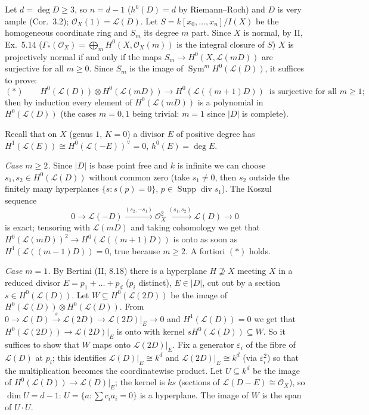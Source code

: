 \documentclass[11pt]{article}
\begin{document}
\pf
Let $d=\deg D\ge3$, so $n=d-1$ ($h^0(D)=d$ by Riemann--Roch) and $D$ is very ample (Cor.~3.2); $\mathcal O_X(1)=\mathcal L(D)$. Let $S=k[x_0,\dots,x_n]/I(X)$ be the homogeneous coordinate ring and $S_m$ its degree $m$ part. Since $X$ is normal, by II, Ex.~5.14 ($\Gamma_*(\mathcal O_X)=\bigoplus_m H^0(X,\mathcal O_X(m))$ is the integral closure of $S$) $X$ is projectively normal if and only if the maps $S_m\to H^0(X,\mathcal L(mD))$ are surjective for all $m\ge0$. Since $S_m$ is the image of $\operatorname{Sym}^mH^0(\mathcal L(D))$, it suffices to prove:
\[ (\ast)\qquad H^0(\mathcal L(D))\otimes H^0(\mathcal L(mD))\to H^0(\mathcal L((m+1)D))\ \text{ is surjective for all }m\ge1 ;\]
then by induction every element of $H^0(\mathcal L(mD))$ is a polynomial in $H^0(\mathcal L(D))$ (the cases $m=0,1$ being trivial: $m=1$ since $|D|$ is complete).

Recall that on $X$ (genus $1$, $K=0$) a divisor $E$ of positive degree has $H^1(\mathcal L(E))\cong H^0(\mathcal L(-E))^\vee=0$, $h^0(E)=\deg E$.

\emph{Case $m\ge2$.} Since $|D|$ is base point free and $k$ is infinite we can choose $s_1,s_2\in H^0(\mathcal L(D))$ without common zero (take $s_1\ne0$, then $s_2$ outside the finitely many hyperplanes $\{s: s(p)=0\}$, $p\in\operatorname{Supp}\operatorname{div}s_1$). The Koszul sequence
\[ 0\to\mathcal L(-D)\xrightarrow{(s_2,-s_1)}\mathcal O_X^2\xrightarrow{(s_1,s_2)}\mathcal L(D)\to0 \]
is exact; tensoring with $\mathcal L(mD)$ and taking cohomology we get that $H^0(\mathcal L(mD))^2\to H^0(\mathcal L((m+1)D))$ is onto as soon as $H^1(\mathcal L((m-1)D))=0$, true because $m\ge2$. A fortiori $(\ast)$ holds.

\emph{Case $m=1$.} By Bertini (II, 8.18) there is a hyperplane $H\not\supseteq X$ meeting $X$ in a reduced divisor $E=p_1+\dots+p_d$ ($p_i$ distinct), $E\in|D|$, cut out by a section $s\in H^0(\mathcal L(D))$. Let $W\subseteq H^0(\mathcal L(2D))$ be the image of $H^0(\mathcal L(D))\otimes H^0(\mathcal L(D))$. From $0\to\mathcal L(D)\xrightarrow{s}\mathcal L(2D)\to\mathcal L(2D)|_E\to0$ and $H^1(\mathcal L(D))=0$ we get that $H^0(\mathcal L(2D))\to\mathcal L(2D)|_E$ is onto with kernel $sH^0(\mathcal L(D))\subseteq W$. So it suffices to show that $W$ maps onto $\mathcal L(2D)|_E$. Fix a generator $\varepsilon_i$ of the fibre of $\mathcal L(D)$ at $p_i$; this identifies $\mathcal L(D)|_E\cong k^d$ and $\mathcal L(2D)|_E\cong k^d$ (via $\varepsilon_i^2$) so that the multiplication becomes the coordinatewise product. Let $U\subseteq k^d$ be the image of $H^0(\mathcal L(D))\to\mathcal L(D)|_E$; the kernel is $ks$ (sections of $\mathcal L(D-E)\cong\mathcal O_X$), so $\dim U=d-1$: $U=\{a:\sum c_ia_i=0\}$ is a hyperplane. The image of $W$ is the span of $U\cdot U$.
\end{document}
